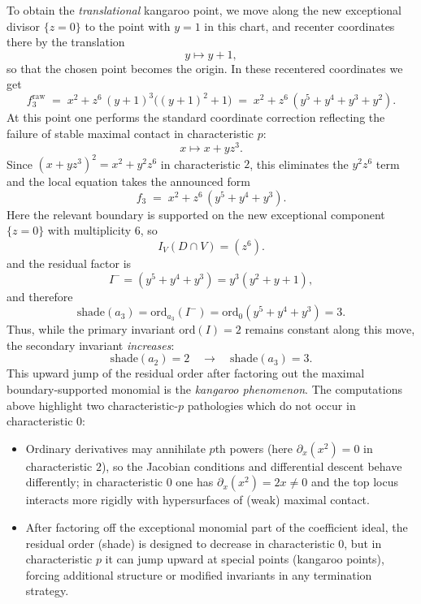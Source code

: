 \documentclass[11pt]{amsart}
\begin{document}
To obtain the \emph{translational} kangaroo point, we move along the new exceptional divisor
$\{z=0\}$ to the point with $y=1$ in this chart, and recenter coordinates there by the translation
\[
y\longmapsto y+1,
\]
so that the chosen point becomes the origin.  In these recentered coordinates we get
\[
f_3^{\mathrm{raw}}
\;=\; x^2+z^6\,(y+1)^3\bigl((y+1)^2+1\bigr)
\;=\; x^2+z^6\,(y^5+y^4+y^3+y^2).
\]
At this point one performs the standard coordinate correction reflecting the failure of stable maximal
contact in characteristic $p$:
\[
x\longmapsto x+yz^3.
\]
Since $(x+yz^3)^2=x^2+y^2z^6$ in characteristic $2$, this eliminates the $y^2z^6$ term and the local
equation takes the announced form
\[
f_3 \;=\; x^2 + z^6\,(y^5+y^4+y^3).
\]
Here the relevant boundary is supported on the new exceptional component $\{z=0\}$ with multiplicity $6$,
so
\[
I_V(D\cap V)=(z^6).
\]
and the residual factor is
\[
I^-=(y^5+y^4+y^3)=y^3(y^2+y+1),
\]
and therefore
\[
\mathrm{shade}(a_3)=\mathrm{ord}_{a_3}(I^-)=\mathrm{ord}_0(y^5+y^4+y^3)=3.
\]
Thus, while the primary invariant $\mathrm{ord}(I)=2$ remains constant along this move, the secondary
invariant \emph{increases}:
\[
\mathrm{shade}(a_2)=2\quad\longrightarrow\quad \mathrm{shade}(a_3)=3.
\]
This upward jump of the residual order after factoring out the maximal boundary-supported monomial is the
\emph{kangaroo phenomenon}. The computations above highlight two characteristic-$p$ pathologies which do not occur in characteristic $0$:
\begin{itemize}
\item Ordinary derivatives may annihilate $p$th powers (here $\partial_x(x^2)=0$ in characteristic $2$),
      so the Jacobian conditions and differential descent behave differently; in characteristic $0$ one has
      $\partial_x(x^2)=2x\neq 0$ and the top locus interacts more rigidly with hypersurfaces of (weak) maximal contact.
\item After factoring off the exceptional monomial part of the coefficient ideal, the residual order
      (shade) is designed to decrease in characteristic $0$, but in characteristic $p$ it can jump
      upward at special points (kangaroo points), forcing additional structure or modified invariants in any
      termination strategy.
\end{itemize}
\end{document}
